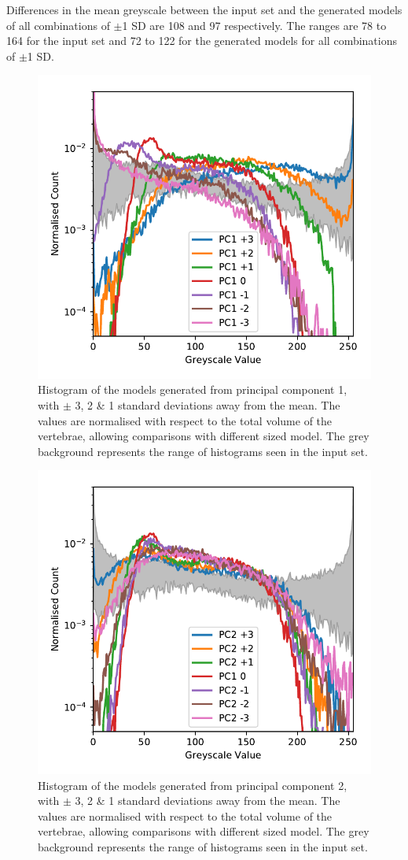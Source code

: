 Differences in the mean greyscale between the input set and the generated
models of all combinations of $\pm$1 SD are 108 and 97 respectively.  The
ranges are 78 to 164 for the input set and 72 to 122 for the generated models
for all combinations of $\pm$1 SD.
\begin{figure}[h!]
  \centering
  \includegraphics[width=.65\textwidth]{Chapters/Chapter_PCA_images/pca1_histo.pdf}
  \caption{Histogram of the models generated from principal component 1, with $\pm$ 3, 2 \& 1 standard deviations away from the mean. The values are normalised with respect to the total volume of the vertebrae, allowing comparisons with different sized model. The grey background represents the range of histograms seen in the input set.}
  \label{fig:pca1_histo}
\end{figure}

\begin{figure}[h!]
  \centering
  \includegraphics[width=.65\textwidth]{Chapters/Chapter_PCA_images/pca2_histo.pdf}
  \caption{Histogram of the models generated from principal component 2, with $\pm$ 3, 2 \& 1 standard deviations away from the mean. The values are normalised with respect to the total volume of the vertebrae, allowing comparisons with different sized model. The grey background represents the range of histograms seen in the input set.}
  \label{fig:pca2_histo}
\end{figure}

